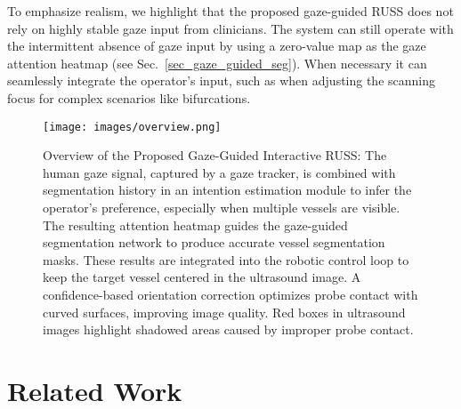 \par
To emphasize realism, we highlight that the proposed gaze-guided RUSS does not rely on highly stable gaze input from clinicians. The system can still operate with the intermittent absence of gaze input by using a zero-value map as the gaze attention heatmap (see Sec.~\ref{sec_gaze_guided_seg}). When necessary it can seamlessly integrate the operator's input, such as when adjusting the scanning focus for complex scenarios like bifurcations.

\begin{figure*}[ht!]
\centering
\texttt{[image: images/overview.png]}
\caption{
Overview of the Proposed Gaze-Guided Interactive RUSS: The human gaze signal, captured by a gaze tracker, is combined with segmentation history in an intention estimation module to infer the operator's preference, especially when multiple vessels are visible. The resulting attention heatmap guides the gaze-guided segmentation network to produce accurate vessel segmentation masks. These results are integrated into the robotic control loop to keep the target vessel centered in the ultrasound image. A confidence-based orientation correction optimizes probe contact with curved surfaces, improving image quality. Red boxes in ultrasound images highlight shadowed areas caused by improper probe contact.
}
\label{Fig_overview}
\end{figure*}


\section{Related Work}
